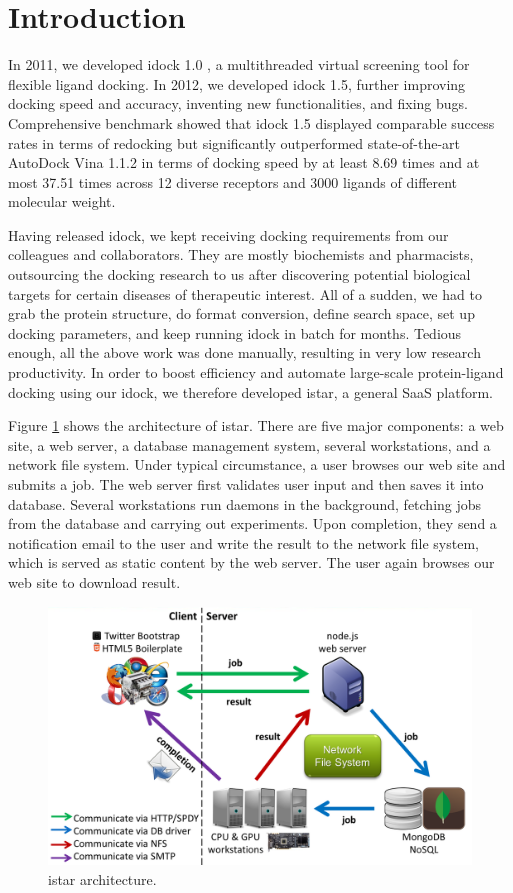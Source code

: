 \documentclass{bioinfo}
\begin{document}
\section{Introduction}

In 2011, we developed idock 1.0 \citep{1153}, a multithreaded virtual screening tool for flexible ligand docking. In 2012, we developed idock 1.5, further improving docking speed and accuracy, inventing new functionalities, and fixing bugs. Comprehensive benchmark showed that idock 1.5 displayed comparable success rates in terms of redocking but significantly outperformed state-of-the-art AutoDock Vina 1.1.2 \citep{595} in terms of docking speed by at least 8.69 times and at most 37.51 times across 12 diverse receptors and 3000 ligands of different molecular weight.

Having released idock, we kept receiving docking requirements from our colleagues and collaborators. They are mostly biochemists and pharmacists, outsourcing the docking research to us after discovering potential biological targets for certain diseases of therapeutic interest. All of a sudden, we had to grab the protein structure, do format conversion, define search space, set up docking parameters, and keep running idock in batch for months. Tedious enough, all the above work was done manually, resulting in very low research productivity. In order to boost efficiency and automate large-scale protein-ligand docking using our idock, we therefore developed istar, a general SaaS platform.

Figure \ref{istar:architecture} shows the architecture of istar. There are five major components: a web site, a web server, a database management system, several workstations, and a network file system. Under typical circumstance, a user browses our web site and submits a job. The web server first validates user input and then saves it into database. Several workstations run daemons in the background, fetching jobs from the database and carrying out experiments. Upon completion, they send a notification email to the user and write the result to the network file system, which is served as static content by the web server. The user again browses our web site to download result.

\begin{figure}
\centerline{\includegraphics[width=\linewidth]{Architecture.png}}
\caption{istar architecture.}\label{istar:architecture}
\end{figure}
\end{document}
